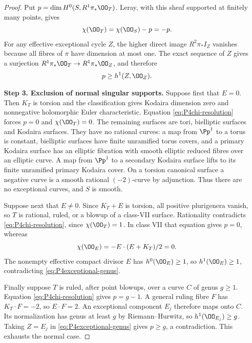 \begin{proof}
Put $p=\dim H^0(S,R^1\pi_*\OO_T)$. Leray, with this sheaf
supported at finitely many points, gives
\begin{equation}\label{eq:P4chi-resolution}
 \chi(\OO_T)=\chi(\OO_S)-p=-p.
\end{equation}
For any effective exceptional cycle $Z$, the higher direct image
$R^2\pi_*I_Z$ vanishes because all fibres of $\pi$ have dimension
at most one. The exact sequence of $Z$ gives a surjection
$R^1\pi_*\OO_T\to R^1\pi_*\OO_Z$, and therefore
\begin{equation}\label{eq:P4exceptional-genus}
 p\ge h^1(Z,\OO_Z).
\end{equation}

\noindent\textbf{Step 3. Exclusion of normal singular supports.}
Suppose first that $E=0$. Then $K_T$ is torsion and the
classification gives Kodaira dimension zero and nonnegative
holomorphic Euler characteristic. Equation
\eqref{eq:P4chi-resolution} forces $p=0$ and $\chi(\OO_T)=0$.
The remaining surfaces are tori, bielliptic surfaces and Kodaira
surfaces. They have no rational curves: a map from $\Pp^1$ to
a torus is constant, bielliptic surfaces have finite unramified
torus covers, and a primary Kodaira surface has an elliptic
fibration with smooth elliptic reduced fibres over an elliptic
curve. A map from $\Pp^1$ to a secondary Kodaira surface lifts
to its finite unramified primary Kodaira cover. On a torsion
canonical surface a negative curve is a smooth rational
$(-2)$-curve by adjunction. Thus there are no exceptional
curves, and $S$ is smooth.

Suppose next that $E\ne0$. Since $K_T+E$ is torsion, all
positive plurigenera vanish, so $T$ is rational, ruled, or a
blowup of a class-VII surface. Rationality contradicts
\eqref{eq:P4chi-resolution}, since $\chi(\OO_T)=1$. In class
VII that equation gives $p=0$, whereas
\[
 \chi(\OO_E)=-E\cdot(E+K_T)/2=0.
\]
The nonempty effective compact divisor $E$ has $h^0(\OO_E)\ge1$,
so $h^1(\OO_E)\ge1$, contradicting
\eqref{eq:P4exceptional-genus}.

Finally suppose $T$ is ruled, after point blowups, over a curve
$C$ of genus $g\ge1$. Equation \eqref{eq:P4chi-resolution}
gives $p=g-1$. A general ruling fibre $F$ has $K_T\cdot F=-2$,
so $E\cdot F=2$. An exceptional component $E_j$ therefore
maps onto $C$. Its normalization has genus at least $g$ by
Riemann--Hurwitz, so $h^1(\OO_{E_j})\ge g$. Taking $Z=E_j$
in \eqref{eq:P4exceptional-genus} gives $p\ge g$, a contradiction.
This exhausts the normal case.


\end{proof}
